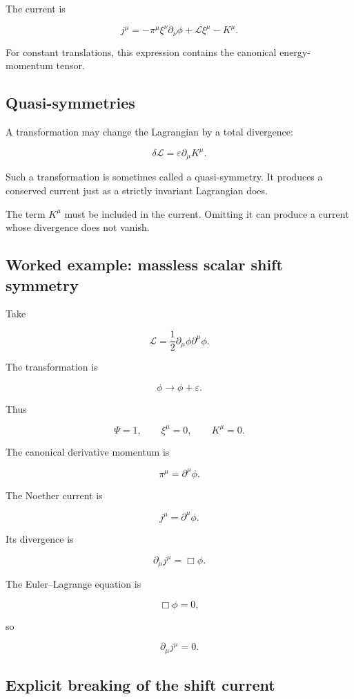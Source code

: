 The current is

\[
j^{\mu}
=
-\pi^{\mu}
\xi^{\nu}\partial_{\nu}\phi
+
\mathcal{L}\xi^{\mu}
-
K^{\mu}.
\]

For constant translations, this expression contains the canonical energy-momentum tensor.

\subsection{Quasi-symmetries}

A transformation may change the Lagrangian by a total divergence:

\[
\delta\mathcal{L}
=
\varepsilon\partial_{\mu}K^{\mu}.
\]

Such a transformation is sometimes called a quasi-symmetry. It produces a conserved current just as a strictly invariant Lagrangian does.

The term \(K^{\mu}\) must be included in the current. Omitting it can produce a current whose divergence does not vanish.

\subsection{Worked example: massless scalar shift symmetry}

Take

\[
\mathcal{L}
=
\frac{1}{2}
\partial_{\mu}\phi
\partial^{\mu}\phi.
\]

The transformation is

\[
\phi
\longrightarrow
\phi+\varepsilon.
\]

Thus

\[
\Psi=1,
\qquad
\xi^{\mu}=0,
\qquad
K^{\mu}=0.
\]

The canonical derivative momentum is

\[
\pi^{\mu}
=
\partial^{\mu}\phi.
\]

The Noether current is

\[
\boxed{
j^{\mu}
=
\partial^{\mu}\phi
}.
\]

Its divergence is

\[
\partial_{\mu}j^{\mu}
=
\Box\phi.
\]

The Euler--Lagrange equation is

\[
\Box\phi=0,
\]

so

\[
\boxed{
\partial_{\mu}j^{\mu}=0
}.
\]

\subsection{Explicit breaking of the shift current}

